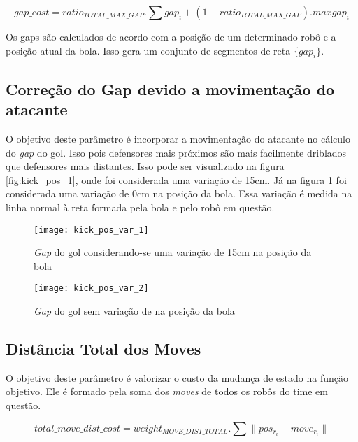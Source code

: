 \begin{dmath} 
 gap{\_}cost = ratio_{TOTAL{\_}MAX{\_}GAP} . \sum gap_i
 + (1 - ratio_{TOTAL{\_}MAX{\_}GAP}) . max{gap_i} 
\end{dmath} 

Os gaps são calculados de acordo com a posição de um determinado robô
e a posição atual da bola. Isso gera um conjunto de segmentos de reta
$\lbrace gap_i \rbrace$.

\subsection{Correção do Gap devido a movimentação do atacante} 

O objetivo deste parâmetro é incorporar a movimentação
do atacante no cálculo do \textit{gap} do gol. Isso pois defensores mais
próximos são mais facilmente driblados que defensores mais distantes. Isso
pode ser visualizado na figura \ref{fig:kick_pos_1}, onde foi considerada
uma variação de 15cm. Já na figura \ref{fig:kick_pos_2} foi considerada uma
variação de 0cm na posição da bola. Essa variação é medida na linha normal
à reta formada pela bola e pelo robô em questão.


\begin{figure}[h]
  \centering
  \texttt{[image: kick\_pos\_var\_1]}
  \caption{\textit{Gap} do gol considerando-se uma variação de 15cm na 
           posição da bola}\label{fig:kick_pos_1}
  \texttt{[image: kick\_pos\_var\_2]}
  \caption{\textit{Gap} do gol sem variação de na posição da
           bola}\label{fig:kick_pos_2}
\end{figure}


\subsection{Distância Total dos Moves} 

O objetivo deste parâmetro é valorizar o custo da
mudança de estado na função objetivo. Ele é formado pela soma dos
\textit{moves} de todos os robôs do time em questão.

\begin{dmath} 
 total{\_}move{\_}dist{\_}cost = weight_{MOVE{\_}DIST{\_}TOTAL} . 
 \sum \lVert pos_{r_i} - move_{r_i}\rVert
\end{dmath} 

